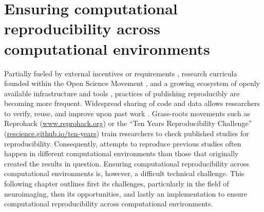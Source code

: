 


\chapter{Ensuring computational reproducibility across computational environments}
\label{chap:k3}

Partially fueled by external incentives or requirements \citep{mckiernan2016open, dfg}, research curricula founded within the Open Science Movement \citep{munafo2017manifesto, poldrack2017scanning}, and a growing ecosystem of openly available infrastructure and tools \citep{NISO2022119623}, practices of publishing reproducibly are becoming more frequent.
Widespread sharing of code and data allows researchers to verify, reuse, and improve upon past work \citep{borghi2018data}.
Grass-roots movements such as Reprohack (\href{https://www.reprohack.org/}{www.reprohack.org}) or the ``Ten Years Reproducibility Challenge'' (\href{https://rescience.github.io/ten-years/}{rescience.github.io/ten-years}) train researchers to check published studies for reproducibility.
Consequently, attempts to reproduce previous studies often happen in different computational environments than those that originally created the results in question.
Ensuring computational reproducibility across computational environments is, however, a difficult technical challenge.
This following chapter outlines first its challenges, particularly in the field of neuroimaging, then its opportunities, and lastly an implementation to ensure computational reproducibility across computational environments.

